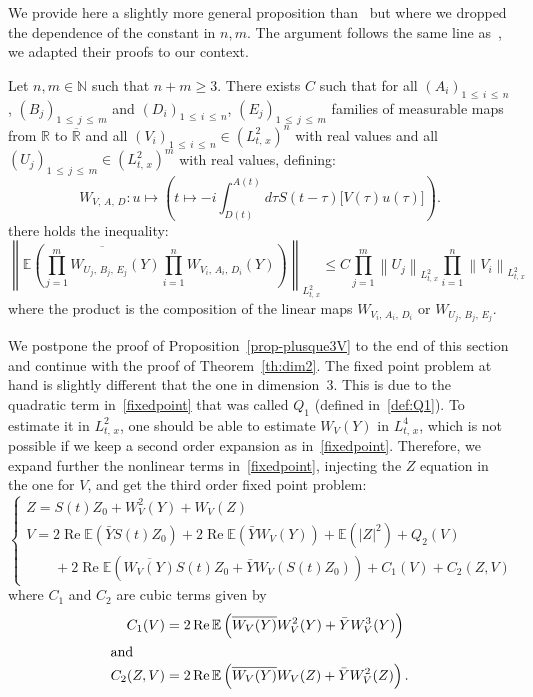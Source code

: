 \documentclass[AHL, Unicode, longabstracts,published]{cedram}
\newcommand{\R}{\mathbb{R}}
\newcommand{\N}{\mathbb{N}}
\newcommand{\E}{\mathbb{E}}
\DeclareMathOperator{\re}{Re}
\newcommand{\barR}{\overline{\R}}
\begin{document}
We provide here a slightly more general proposition than~\cite[Lemma~3]{lewsab2} but where we dropped the dependence of the constant in $n,m$. The argument follows the same line as~\cite{FLLS,lewsab2}, we adapted their proofs to our context.



\begin{prop}\label{prop-plusque3V}
Let $n,m\in \N$ such that $n+m \geq 3$. There exists $C$ such that for all $(A_i)_{1\,\leq\,i\,\leq\,n}$, $(B_j)_{1\,\leq\,j\,\leq\,m}$ and $(D_i)_{1\,\leq\,i\,\leq\, n}$, $(E_j)_{1\,\leq\,j\,\leq\,m}$ families of measurable maps from $\R$ to $\barR$ and all $(V_i)_{1\,\leq\,i\,\leq\,n} \in (L^2_{t,\,x})^n$ with real values and all $(U_j)_{1\,\leq\,j\,\leq\,m} \in (L^2_{t,\,x})^m$ with real values, defining:
\[
W_{V,\,A,\,D} : u \mapsto \left(t\mapsto -i\int_{D(t)}^{A(t)} d\tau S(t-\tau)\big[V(\tau) u(\tau)\big] \right).
\]
there holds the inequality:
\[
\left\|\E \left(\overline{\prod_{j=1}^m W_{U_j,\,B_j,\,E_j} (Y)} \prod_{i=1}^n W_{V_i,\,A_i,\,D_i}(Y)\right)\right\|_{L^2_{t,\,x}} \leq C \prod_{j=1}^m \left\|U_j\right\|_{L^2_{t,\,x}}\prod_{i=1}^n \left\|V_i\right\|_{L^2_{t,\,x}}
\]
where the product is the composition of the linear maps $W_{V_i,\,A_i,\,D_i}$ or $W_{U_j,\,B_j,\,E_j}$.
\end{prop}


We postpone the proof of Proposition~\ref{prop-plusque3V} to the end of this section and continue with the proof of Theorem~\ref{th:dim2}. The fixed point problem at hand is slightly different that the one in dimension~3. This is due to the quadratic term in~\eqref{fixedpoint} that was called $Q_1$ (defined in~\eqref{def:Q1}). To estimate it in $L^2_{t,\,x}$, one should be able to estimate $W_V(Y)$ in $L^4_{t,\,x}$, which is not possible if we keep a second order expansion as in~\eqref{fixedpoint}. Therefore, we expand further the nonlinear terms in~\eqref{fixedpoint}, injecting the $Z$ equation in the one for $V$, and get the third order fixed point problem:
\begin{equation}\label{fixpointdim2}
\begin{cases}
Z = S(t)Z_0 + W_V^2(Y) + W_V(Z) \\
V = 2\re \E\left(\bar Y S(t) Z_0\right) + 2\re\E \left(\bar Y W_V(Y)\right) + \E\left(|Z|^2\right) + Q_2(V) \\
\qquad + 2\re \E \left(\overline{W_V(Y)} S(t) Z_0 + \bar Y W_V\left(S(t) Z_0\right)\right) + C_1(V) + C_2(Z,V)
\end{cases}
\end{equation}
where $C_1$ and $C_2$ are cubic terms given by
\begin{align*}
C_1(V) &= 2\re \E\left(\overline{W_V(Y)} W_V^2(Y)+ \bar Y W_V^3(Y)\right)
\\
\intertext{and}
C_2(Z,V) &= 2\re \E\left(\overline{W_V(Y)} W_V(Z) + \bar Y W_V^2(Z) \right).
\end{align*}
\end{document}
